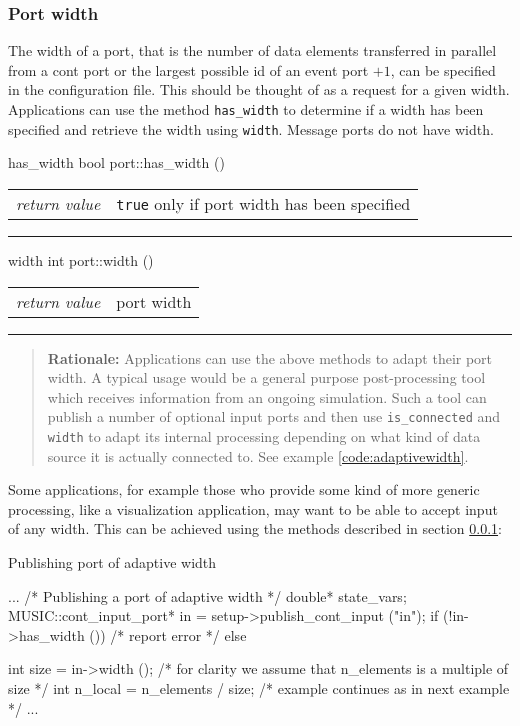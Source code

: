 \documentclass[a4paper]{report}
\makeatletter
\newenvironment{rationale}%
{\par\begin{quote}\textbf{Rationale:}}%
{\par\end{quote}}
\newenvironment{parameters}%
{\begin{tabular}{@{\hspace{2em}}lp{0.6\textwidth}}}%
{\end{tabular}\par\vspace{1mm}\par\hrule\par\vspace{5mm}}
\makeatother
\begin{document}
\subsubsection{Port width}
\label{sec:width}

The width of a port, that is the number of data
elements transferred in parallel from a cont port or the largest
possible id of an event port $+ 1$, can be specified in the
configuration file.  This should be thought of as a request for a
given width.  Applications can use the method \lstinline|has_width| to
determine if a width has been specified and retrieve the width using
\lstinline|width|.  Message ports do not have width.

\begin{head}{has_width}
  bool port::has_width ()
\end{head}
\begin{parameters}
  \emph{return value} & \lstinline|true| only if port width has been
                         specified \\
\end{parameters}

\begin{head}{width}
  int port::width ()
\end{head}
\begin{parameters}
  \emph{return value} & port width \\
\end{parameters}

\begin{rationale}
  Applications can use the above methods to adapt their port width.  A
  typical usage would be a general purpose post-processing tool which
  receives information from an ongoing simulation.  Such a tool can
  publish a number of optional input ports and then use
  \lstinline|is_connected| and \lstinline|width| to adapt its internal
  processing depending on what kind of data source it is actually
  connected to.  See example \ref{code:adaptivewidth}.
\end{rationale}


Some applications, for example those who provide some kind of more
generic processing, like a visualization application, may want to be
able to accept input of any width.  This can be achieved using the
methods described in section \ref{sec:width}:

\begin{code}{Publishing port of adaptive width\label{code:adaptivewidth}}
{
  ...
  /* Publishing a port of adaptive width */
  double* state_vars;
  MUSIC::cont_input_port* in =
     setup->publish_cont_input ("in");
  if (!in->has_width ())
    /* report error */
  else
    {
      int size = in->width ();
      /* for clarity we assume that n_elements
         is a multiple of size */
      int n_local = n_elements / size;
      /* example continues as in next example */
      ...
      
    }
}
\end{code}
\end{document}
